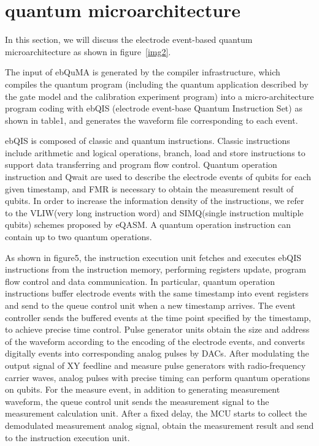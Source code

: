 \section{quantum microarchitecture}
In this section, we will discuss the electrode event-based quantum microarchitecture as shown in figure~\ref{img2}. 

The input of ebQuMA is generated by the compiler infrastructure, 
which compiles the quantum program 
(including the quantum application described by the gate model and the calibration experiment program) 
into a micro-architecture program coding with ebQIS (electrode event-base Quantum Instruction Set) as shown in table1, 
and generates the waveform file corresponding to each event. 

ebQIS is composed of classic and quantum instructions. 
Classic instructions include arithmetic and logical operations, branch, load and store instructions to support data transferring and program flow control.  
Quantum operation instruction and Qwait are used to describe the electrode events of qubits for each given timestamp, 
and FMR is necessary to obtain the measurement result of qubits. 
In order to increase the information density of the instructions, 
we refer to the VLIW(very long instruction word) and SIMQ(single instruction multiple qubits) schemes proposed by eQASM. 
A quantum operation instruction can contain up to two quantum operations. 

As shown in figure5, the instruction execution unit fetches and executes ebQIS instructions from the instruction memory, performing registers update, program flow control and data communication. 
In particular, quantum operation instructions buffer electrode events with the same timestamp into event registers and send to the queue control unit when a new timestamp arrives. 
The event controller sends the buffered events at the time point specified by the timestamp, to achieve precise time control. 
Pulse generator units obtain the size and address of the waveform according to the encoding of the electrode events, and converts digitally events into corresponding analog pulses by DACs. 
After modulating the output signal of XY feedline and measure pulse generators with radio-frequency carrier waves, 
analog pulses with precise timing can perform quantum operations on qubits. For the measure event, 
in addition to generating measurement waveform, the queue control unit sends the measurement signal to the measurement calculation unit. 
After a fixed delay, the MCU starts to collect the demodulated measurement analog signal, 
obtain the measurement result and send to the instruction execution unit.

